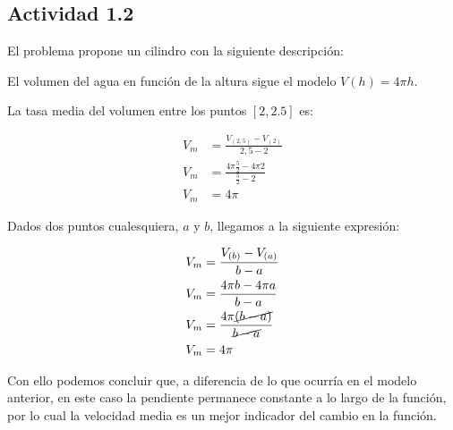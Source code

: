 \subsection*{Actividad 1.2}

El problema propone un cilindro con la siguiente descripción:

\begin{center}
\end{center}

El volumen del agua en función de la altura sigue el modelo $V(h) = 4\pi h$. 

La tasa media del volumen entre los puntos $[2,2.5]$ es:

\begin{align*}
    V_m &= \frac{V_{(2,5)} - V_{(2)}}{2,5-2}\\
    V_m &= \frac{4\pi\frac{5}{2} - 4\pi 2}{\frac{5}{2}-2}\\
    V_m &= 4\pi
\end{align*}

Dados dos puntos cualesquiera, $a$ y $b$, llegamos a la siguiente expresión:

\begin{align*}
    V_m &= \frac{V_{(b)} - V_{(a)}}{b-a}\\
    V_m &= \frac{4\pi b - 4\pi a}{b-a}\\
    V_m &= \frac{4\pi \cancel{(b - a)}}{\cancel{b-a}}\\
    V_m &= 4\pi
\end{align*}

Con ello podemos concluir que, a diferencia de lo que ocurría en el modelo anterior, en este caso la pendiente permanece constante a lo largo de la función, por lo cual la velocidad media es un mejor indicador del cambio en la función.
